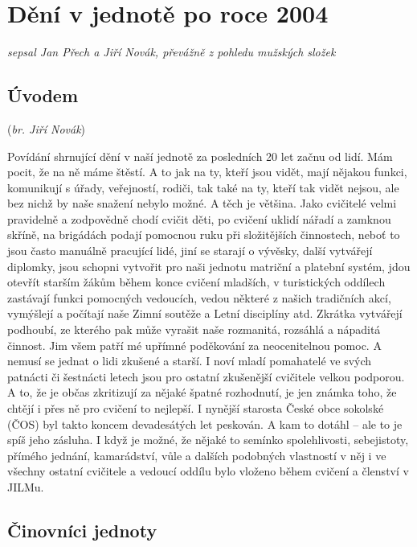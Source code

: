 \section{Dění v jednotě po roce
2004}\label{dux11bnuxed-v-jednotux11b-po-roce-2004}

\emph{sepsal Jan Přech a Jiří Novák, převážně z pohledu mužských složek}

\subsection{\texorpdfstring{Úvodem }{Úvodem }}\label{uxfavodem}

(\emph{br. Jiří Novák})

Povídání shrnující dění v naší jednotě za posledních 20 let začnu od
lidí. Mám pocit, že na ně máme štěstí. A to jak na ty, kteří jsou vidět,
mají nějakou funkci, komunikují s úřady, veřejností, rodiči, tak také na
ty, kteří tak vidět nejsou, ale bez nichž by naše snažení nebylo možné.
A těch je většina. Jako cvičitelé velmi pravidelně a zodpovědně chodí
cvičit děti, po cvičení uklidí nářadí a zamknou skříně, na brigádách
podají pomocnou ruku při složitějších činnostech, neboť to jsou často
manuálně pracující lidé, jiní se starají o vývěsky, další vytvářejí
diplomky, jsou schopni vytvořit pro naši jednotu matriční a platební
systém, jdou otevřít starším žákům během konce cvičení mladších, v
turistických oddílech zastávají funkci pomocných vedoucích, vedou
některé z našich tradičních akcí, vymýšlejí a počítají naše Zimní
soutěže a Letní disciplíny atd. Zkrátka vytvářejí podhoubí, ze kterého
pak může vyrašit naše rozmanitá, rozsáhlá a nápaditá činnost. Jim všem
patří mé upřímné poděkování za neocenitelnou pomoc. A nemusí se jednat o
lidi zkušené a starší. I noví mladí pomahatelé ve svých patnácti či
šestnácti letech jsou pro ostatní zkušenější cvičitele velkou podporou.
A to, že je občas zkritizují za nějaké špatné rozhodnutí, je jen známka
toho, že chtějí i přes ně pro cvičení to nejlepší. I nynější starosta
České obce sokolské (ČOS) byl takto koncem devadesátých let peskován. A
kam to dotáhl -- ale to je spíš jeho zásluha. I když je možné, že nějaké
to semínko spolehlivosti, sebejistoty, přímého jednání, kamarádství,
vůle a dalších podobných vlastností v něj i ve všechny ostatní cvičitele
a vedoucí oddílu bylo vloženo během cvičení a členství v JILMu.

\subsection{Činovníci jednoty}\label{ux10dinovnuxedci-jednoty}

